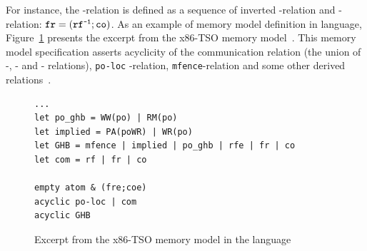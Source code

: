 For instance, the \fr-relation is defined as a sequence of inverted \rf-relation and \co-relation: $\texttt{fr} = (\texttt{rf}^{\texttt{-1}};\texttt{co})$.
As an example of memory model definition in \cat{} language, Figure~\ref{ex:x86-cat} presents the excerpt from the x86-TSO memory model~\cite{herd10tutorial}.
This memory model specification asserts  acyclicity of the communication relation (the union of \rf-, \fr- and \co- relations), \texttt{po-loc} -relation, \texttt{mfence}-relation and some other derived relations~\cite{owens2009better}.

\begin{figure}[H]
\begin{lstlisting}
...
let po_ghb = WW(po) | RM(po)
let implied = PA(poWR) | WR(po)
let GHB = mfence | implied | po_ghb | rfe | fr | co
let com = rf | fr | co

empty atom & (fre;coe)
acyclic po-loc | com
acyclic GHB
\end{lstlisting}
\caption{Excerpt from the x86-TSO memory model in the \cat{} language}
\label{ex:x86-cat}
\end{figure}
